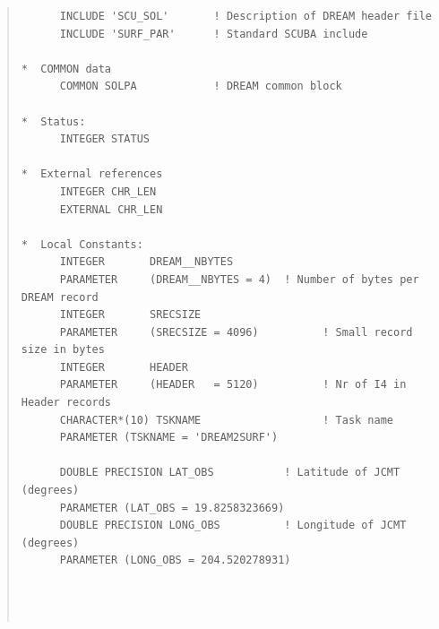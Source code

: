 \documentclass[twoside,11pt]{article}
\newenvironment{myquote}{\begin{quote}\begin{small}}{\end{small}\end{quote}}
\renewcommand{\_}{\texttt{\symbol{95}}}
\begin{document}
\begin{myquote}
\begin{verbatim}
      INCLUDE 'SCU_SOL'       ! Description of DREAM header file
      INCLUDE 'SURF_PAR'      ! Standard SCUBA include

*  COMMON data
      COMMON SOLPA            ! DREAM common block

*  Status:
      INTEGER STATUS

*  External references
      INTEGER CHR_LEN
      EXTERNAL CHR_LEN

*  Local Constants:
      INTEGER       DREAM__NBYTES
      PARAMETER     (DREAM__NBYTES = 4)  ! Number of bytes per DREAM record
      INTEGER       SRECSIZE
      PARAMETER     (SRECSIZE = 4096)          ! Small record size in bytes
      INTEGER       HEADER
      PARAMETER     (HEADER   = 5120)          ! Nr of I4 in Header records
      CHARACTER*(10) TSKNAME                   ! Task name
      PARAMETER (TSKNAME = 'DREAM2SURF')

      DOUBLE PRECISION LAT_OBS           ! Latitude of JCMT (degrees)
      PARAMETER (LAT_OBS = 19.8258323669)
      DOUBLE PRECISION LONG_OBS          ! Longitude of JCMT (degrees)
      PARAMETER (LONG_OBS = 204.520278931)




\end{verbatim}
\end{myquote}
\end{document}
